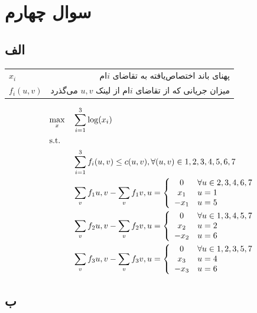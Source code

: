 \documentclass[paper=a4, fontsize=11pt]{article}
\numberwithin{equation}{section} %
\numberwithin{figure}{section} %
\numberwithin{table}{section} %
\begin{document}
\section{سوال چهارم}
\subsection{الف}
\begin{tabular}{l r}
	\(x_i\) & پهنای باند اختصاص‌یافته به تقاضای \(i\)ام\\
	\(f_i(u, v)\) & میزان جریانی که از تقاضای \(i\)ام از لینک \(u, v\) می‌گذرد\\
\end{tabular}
\begin{equation}
	\begin{aligned}
		& \underset{x}{\text{max}}
		& & \sum_{i=1}^{3} \log(x_i) \\
		& \text{s.t.} \\
		& & & \sum_{i=1}^{3} f_i(u, v) \le c(u, v), \forall (u, v) \in {1, 2, 3, 4, 5, 6, 7} \\
		& & & \sum_{v} f_1{u, v} - \sum_{v} f_1{v, u} = \left\{ \begin{array}{c l}
			0 & \forall u \in {2, 3, 4, 6, 7}\\
			x_1 & u = 1\\
			-x_1 & u = 5\\
		\end{array} \right.\\
		& & & \sum_{v} f_2{u, v} - \sum_{v} f_2{v, u} = \left\{ \begin{array}{c l}
			0 & \forall u \in {1, 3, 4, 5, 7}\\
			x_2 & u = 2\\
			-x_2 & u = 6\\
		\end{array} \right.\\
		& & & \sum_{v} f_3{u, v} - \sum_{v} f_3{v, u} = \left\{ \begin{array}{c l}
			0 & \forall u \in {1, 2, 3, 5, 7}\\
			x_3 & u = 4\\
			-x_3 & u = 6\\
		\end{array} \right.\\
	\end{aligned}
\end{equation}

\subsection{ب}
\end{document}
